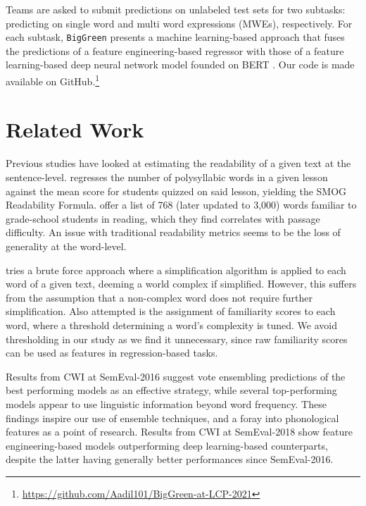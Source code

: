 \documentclass[11pt,a4paper]{article}
\begin{document}
Teams are asked to submit predictions on unlabeled test sets for two subtasks: predicting on single word and multi word expressions (MWEs), respectively. For each subtask, \texttt{BigGreen} presents a machine learning-based approach that fuses the predictions of a feature engineering-based regressor with those of a feature learning-based deep neural network model founded on BERT \citep{devlin2018bert}. Our code is made available on GitHub.\footnote{\url{https://github.com/Aadil101/BigGreen-at-LCP-2021}}

\section{Related Work}

Previous studies have looked at estimating the readability of a given text at the sentence-level. \citet{mc1969smog} regresses the number of polysyllabic words in a given lesson against the mean score for students quizzed on said lesson, yielding the SMOG Readability Formula. \citet{dale1948formula} offer a list of 768 (later updated to 3,000) words familiar to grade-school students in reading, which they find correlates with passage difficulty. An issue with traditional readability metrics seems to be the loss of generality at the word-level.

\citet{shardlow2013comparison} tries a brute force approach where a simplification algorithm is applied to each word of a given text, deeming a world complex if simplified. However, this suffers from the assumption that a non-complex word does not require further simplification. Also attempted is the assignment of familiarity scores to each word, where a threshold determining a word's complexity is tuned. We avoid thresholding in our study as we find it unnecessary, since raw familiarity scores can be used as features in regression-based tasks. 

Results from CWI at SemEval-2016 \citep{zampieri2017complex} suggest vote ensembling predictions of the best performing models as an effective strategy, while several top-performing models \citep{paetzold2016sv000gg, ronzano2016taln, mukherjee2016ju_nlp} appear to use linguistic information beyond word frequency. These findings inspire our use of ensemble techniques, and a foray into phonological features as a point of research. Results from CWI at SemEval-2018 show feature engineering-based models outperforming deep learning-based counterparts, despite the latter having generally better performances since SemEval-2016.
\end{document}
